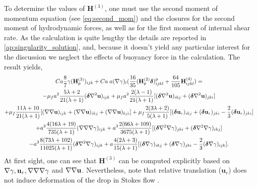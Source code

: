 To determine the values of $\textbf{H}^{(3)}$, one must use the second moment of momentum equation (see \ref{eq:second_mom}) and the closures for the second moment of hydrodynamic forces, as well as for the first moment of internal shear rate. 
As the calculation is quite lengthy the details are reported in  \ref{ap:singularity_solution}, and, because it doesn't yield any particular interest for the discussion we neglect the effects of buoyancy force in the calculation. 
The result yields, 
\begin{multline}
    \label{eq:defH3}
    Ca \frac{8}{7} \gamma (\textbf{H}_p^{(3)})_{ijk}
    +
    Ca \; a (\grad \gamma)_l(  \frac{16}{35} 
    (\textbf{H}_p^{(2)}\bm\delta)^\text{p}_{ijkl}
    +
    \frac{64}{105} \textbf{H}^{(4)}_{ijkl})
    =\\
    - \mu_f a^2 \frac{5\lambda+2}{21(\lambda+1)} (\bm\delta \grad^2 \textbf{u})_{ijk}
    + \mu_f a^2 \frac{2(\lambda-1)}{21(\lambda+1)} [
        (\bm\delta \grad^2 \textbf{u})_{ikj}
        + (\bm\delta \grad^2 \textbf{u})_{jki}
        ]  \\
    + \mu_f \frac{11\lambda+10}{21(\lambda+1)} [(\grad\grad \textbf{u})_{ijk}+(\grad\grad \textbf{u})_{ikj}+(\grad\grad \textbf{u})_{kji}] 
    + \mu_f\frac{2(3\lambda+2)}{5(\lambda+1)}[
        (\bm\delta \textbf{u}_r)_{ikj}
        +(\bm\delta \textbf{u}_r)_{jki}
        - \frac{2}{3}(\bm\delta \textbf{u}_r)_{jki}
        ] \\
    +a^3\frac{4(16\lambda + 19)}{735(\lambda +1)}(\grad\grad\grad \gamma)_{ijk}
    +a^3\frac{2(66\lambda + 109)}{3675(\lambda +1)}
    [
        (\bm\delta \grad^2\grad \gamma)_{jki}
        + (\bm\delta \grad^2\grad \gamma)_{ikj}
    ] \\
    - a^3 \frac{8(73\lambda+102)}{11025(\lambda +1)} 
    (\bm\delta \grad^2\grad \gamma)_{ijk}
    +a \frac{4(2\lambda +3)}{15(\lambda +1)}  
    [
        (\bm\delta\grad \gamma)_{ikj}
        + (\bm\delta\grad \gamma)_{jki}
        - \frac{2}{3}(\bm\delta\grad \gamma)_{ijk}
    ].
\end{multline}
At first sight, one can see that $\textbf{H}^{(3)}$ can be computed explicitly based on $\mathbf{\nabla}\gamma, \textbf{u}_r, \mathbf{\nabla}\mathbf{\nabla}\mathbf{\nabla}\gamma$ and $\mathbf{\nabla} \mathbf{\nabla} \textbf{u}$. 
Nevertheless, note that relative translation ($\textbf{u}_r$) does not induce deformation of the drop in Stokes flow \citep{nadim1991motion}. 
